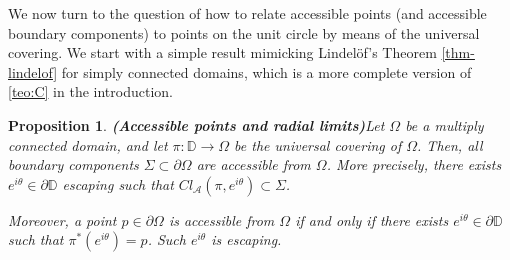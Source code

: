 \documentclass[11pt,a4paper,reqno]{amsart}
\theoremstyle{plain}
\newtheorem{prop}[thm]{Proposition}
\theoremstyle{definition}
\theoremstyle{plain}
\begin{document}
We now turn to the question of how to relate accessible points (and accessible boundary components)  to points on the unit circle by means of the universal covering. We start with a simple result mimicking Lindel\"of's Theorem \ref{thm-lindelof} for simply connected domains, which is a more complete version of \ref{teo:C} in the introduction.
\begin{prop}
	{\bf (Accessible points and radial limits)}\label{prop:access}
	Let $ \Omega $ be a multiply connected domain, and let $ \pi\colon\mathbb{D}\to\Omega $ be the universal covering of $ \Omega $. Then, all boundary components $ \Sigma\subset \partial \Omega $ are accessible from $ \Omega $.	More precisely, 
	there exists $ e^{i\theta}\in \partial \mathbb{D} $ escaping such that $ Cl_\mathcal{A}(\pi, e^{i\theta})\subset\Sigma $.
	
	\noindent Moreover, a point $ p\in\partial \Omega $ is accessible from $ \Omega $ if and only if there exists $ e^{i\theta}\in \partial \mathbb{D} $ such that $ \pi^* (e^{i\theta}) =p$. Such $ e^{i\theta} $ is escaping.
	\end{prop}
\end{document}
